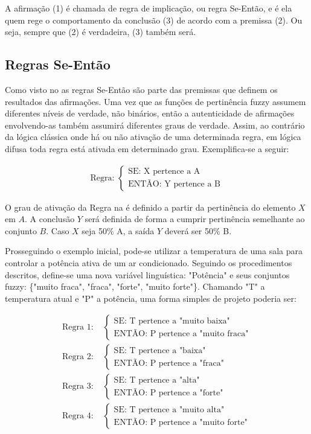 A afirmação (1) é chamada de regra de implicação, ou regra Se-Então, e é ela quem rege o comportamento da conclusão (3) de acordo com a premissa (2). Ou seja, sempre que (2) é verdadeira, (3) também será.

\subsection{Regras Se-Então}
Como visto no  as regras Se-Então são parte das premissas que definem os resultados das afirmações. Uma vez que as funções de pertinência fuzzy assumem diferentes níveis de verdade, não binários, então a autenticidade de afirmações envolvendo-as também assumirá diferentes graus de verdade. Assim, ao contrário da lógica clássica onde há ou não ativação de uma determinada regra, em lógica difusa toda regra está ativada em determinado grau. Exemplifica-se a seguir:

\begin{align} \label{eqRegraDef}
\text{Regra: }
\begin{cases}
	\text{SE: X pertence a A} \\
	\text{ENTÃO: Y pertence a B}
\end{cases}		
\end{align}

O grau de ativação da Regra na  é definido a partir da pertinência do elemento $X$ em $A$. A conclusão $Y$ será definida de forma a cumprir pertinência semelhante ao conjunto $B$. Caso $X$ seja 50\% A, a saída $Y$ deverá ser 50\% B.

Prosseguindo o exemplo inicial, pode-se utilizar a temperatura de uma sala para controlar a potência ativa de um ar condicionado.  Seguindo os procedimentos descritos, define-se uma nova variável linguística: "Potência" e seus conjuntos fuzzy: \{"muito fraca", "fraca", "forte", "muito forte"\}. Chamando "T" a temperatura atual e "P" a potência, uma forma simples de projeto poderia ser:

\begin{align*}
\text{Regra 1: }
	&\begin{cases}
		\text{SE: T pertence a "muito baixa" } \\
		\text{ENTÃO: P pertence a "muito fraca"}
	\end{cases}		\\
\text{Regra 2: }
	&\begin{cases}
		\text{SE: T pertence a "baixa"} \\
		\text{ENTÃO: P pertence a "fraca"}
	\end{cases}		\\
\text{Regra 3: }
	&\begin{cases}
		\text{SE: T pertence a "alta"} \\
		\text{ENTÃO: P pertence a "forte"}
	\end{cases}		\\
\text{Regra 4: }
	&\begin{cases}
		\text{SE: T pertence a "muito alta"} \\
		\text{ENTÃO: P pertence a "muito forte"}
	\end{cases}		
\end{align*}

